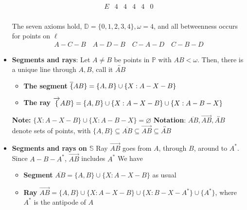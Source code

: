 \documentclass{report}
\begin{document}
\begin{itemize}
\begin{align*}
\begin{array}{c|ccccc}
                    E & 4 & 4& 4 & 4 & 0\\
                \end{array}
            \end{align*}
            \bigbreak \noindent 
            \begin{figure}[ht]
                \centering
                \label{fig:ic}
            \end{figure}
            \bigbreak \noindent 
            The seven axioms hold, $\mathbb{D} = \{0,1,2,3,4\}, \omega = 4$, and all betweenness occurs for points on $\ell$
            \begin{align*}
                A-C-B \quad A-D-B \quad C-A-D \quad C-B-D
            \end{align*}
        \item \textbf{Segments and rays}: Let $A\ne B$ be points in $ \mathbb{P}$ with $AB < \omega $. Then, there is a unique line through $A,B$, call it $ \overleftrightarrow{AB}$ 
            \begin{itemize}
                \item \textbf{The segment} $\overline\{AB\} = \{A,B\} \cup \{X: A-X-B\}$
                \item \textbf{The ray} $\overrightarrow\{AB\} = \{A,B\} \cup \{X: A-X-B\} \cup \{X: A-B-X\}$
            \end{itemize}
            \textbf{Note:} $\{X: A-X-B\} \cup \{X: A-B-X\} = \varnothing$
            \bigbreak \noindent 
            \textbf{Notation}: $\overline{AB}, \overrightarrow{AB}, \overleftrightarrow{AB}$ denote sets of points, with $\{A,B\} \subseteq \overline{AB} \subseteq \overrightarrow{AB} \subseteq \overleftrightarrow{AB}$
        \item \textbf{Segments and rays on $\mathbb{S}$}
            \bigbreak \noindent 
            \bigbreak \noindent 
            Ray $\overrightarrow{AB}$ goes from $A$, through $B$, around to $A^{*}$. Since $A-B-A^{*}$, $\overrightarrow{AB}$ includes $A^{*} $
            \bigbreak \noindent 
            We have 
            \begin{itemize}
                \item \textbf{Segment} $\overline{AB} = \{A,B\} \cup \{X: A-X-B\}$ as usual
                \item \textbf{Ray} $\overrightarrow{AB} = \{A,B\} \cup \{X: A-X-B\} \cup \{X: B-X-A^{*}\} \cup \{A^{*}\}$, where $A^{*}$ is the antipode of $A$
            \end{itemize}


\end{itemize}
\end{document}
